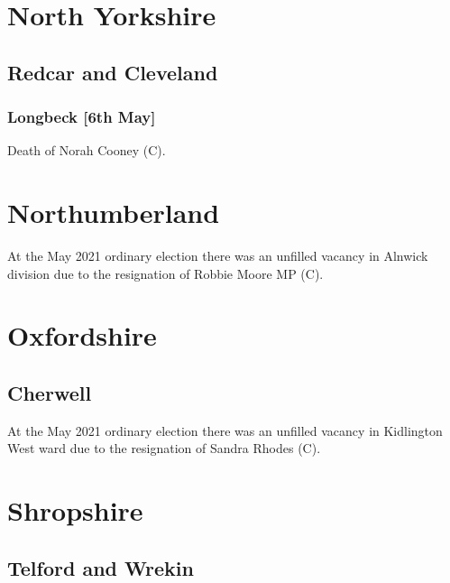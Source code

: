 \documentclass[a4paper,openany]{book}
\begin{document}
\begin{resultsiii}
\section{North Yorkshire}

\subsection*{Redcar and Cleveland}

\subsubsection*{Longbeck \hspace*{\fill}\nolinebreak[1]%
	\enspace\hspace*{\fill}
	[6th May]}


Death of Norah Cooney (C).

\section{Northumberland}

At the May 2021 ordinary election there was an unfilled vacancy in Alnwick division due to the resignation of Robbie Moore MP (C).

\section{Oxfordshire}

\subsection*{Cherwell}

At the May 2021 ordinary election there was an unfilled vacancy in Kidlington West ward due to the resignation of Sandra Rhodes (C).

\section{Shropshire}

\subsection*{Telford and Wrekin}


\end{resultsiii}
\end{document}
